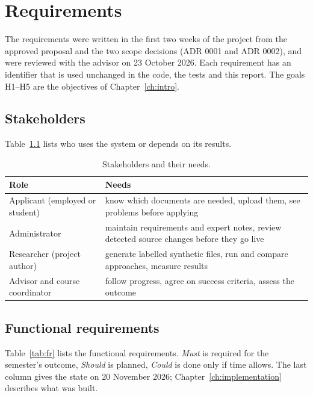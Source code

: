 \chapter{Requirements}\label{ch:requirements}

The requirements were written in the first two weeks of the project from the approved proposal
and the two scope decisions (ADR 0001 and ADR 0002), and were reviewed with the advisor on
23 October 2026. Each requirement has an identifier that is used unchanged in the code, the tests
and this report. The goals H1--H5 are the objectives of Chapter~\ref{ch:intro}.

\section{Stakeholders}
Table~\ref{tab:stakeholders} lists who uses the system or depends on its results.

\begin{table}[ht]
  \centering
  \small
  \caption{Stakeholders and their needs.}
  \label{tab:stakeholders}
  \begin{tabularx}{\textwidth}{@{}lX@{}}
    \toprule
    Role & Needs \\
    \midrule
    Applicant (employed or student) & know which documents are needed, upload them, see problems before applying \\
    Administrator & maintain requirements and expert notes, review detected source changes before they go live \\
    Researcher (project author) & generate labelled synthetic files, run and compare approaches, measure results \\
    Advisor and course coordinator & follow progress, agree on success criteria, assess the outcome \\
    \bottomrule
  \end{tabularx}
\end{table}

\section{Functional requirements}
Table~\ref{tab:fr} lists the functional requirements. \emph{Must} is required for the semester's
outcome, \emph{Should} is planned, \emph{Could} is done only if time allows. The last column gives
the state on 20 November 2026; Chapter~\ref{ch:implementation} describes what was built.

